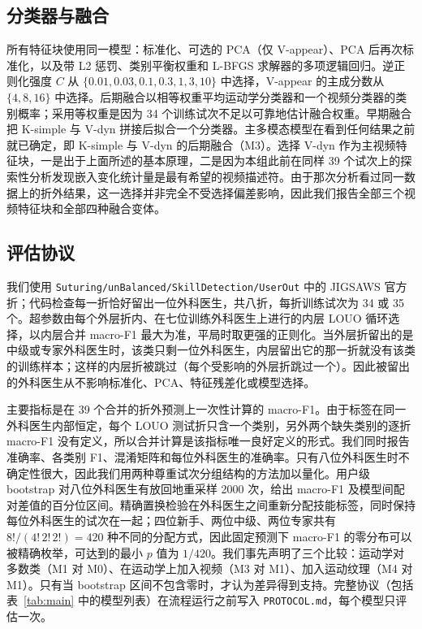 \subsection{分类器与融合}

所有特征块使用同一模型：标准化、可选的 PCA（仅 V-appear）、PCA 后再次标准化，以及带 L2 惩罚、类别平衡权重和 L-BFGS 求解器的多项逻辑回归\citep{pedregosa2011sklearn}。逆正则化强度 $C$ 从 $\{0.01, 0.03, 0.1, 0.3, 1, 3, 10\}$ 中选择，V-appear 的主成分数从 $\{4, 8, 16\}$ 中选择。后期融合以相等权重平均运动学分类器和一个视频分类器的类别概率；采用等权重是因为 34 个训练试次不足以可靠地估计融合权重。早期融合把 K-simple 与 V-dyn 拼接后拟合一个分类器。主多模态模型在看到任何结果之前就已确定，即 K-simple 与 V-dyn 的后期融合（M3）。选择 V-dyn 作为主视频特征块，一是出于上面所述的基本原理，二是因为本组此前在同样 39 个试次上的探索性分析发现嵌入变化统计量是最有希望的视频描述符。由于那次分析看过同一数据上的折外结果，这一选择并非完全不受选择偏差影响，因此我们报告全部三个视频特征块和全部四种融合变体。

\subsection{评估协议}

我们使用 \texttt{Suturing/unBalanced/SkillDetection/UserOut} 中的 JIGSAWS 官方折；代码检查每一折恰好留出一位外科医生，共八折，每折训练试次为 34 或 35 个。超参数由每个外层折内、在七位训练外科医生上进行的内层 LOUO 循环选择，以内层合并 macro-F1 最大为准，平局时取更强的正则化。当外层折留出的是中级或专家外科医生时，该类只剩一位外科医生，内层留出它的那一折就没有该类的训练样本；这样的内层折被跳过（每个受影响的外层折跳过一个）。因此被留出的外科医生从不影响标准化、PCA、特征残差化或模型选择。

主要指标是在 39 个合并的折外预测上一次性计算的 macro-F1。由于标签在同一外科医生内部恒定，每个 LOUO 测试折只含一个类别，另外两个缺失类别的逐折 macro-F1 没有定义，所以合并计算是该指标唯一良好定义的形式。我们同时报告准确率、各类别 F1、混淆矩阵和每位外科医生的准确率。只有八位外科医生时不确定性很大，因此我们用两种尊重试次分组结构的方法加以量化。用户级 bootstrap 对八位外科医生有放回地重采样 2000 次，给出 macro-F1 及模型间配对差值的百分位区间。精确置换检验在外科医生之间重新分配技能标签，同时保持每位外科医生的试次在一起；四位新手、两位中级、两位专家共有 $8!/(4!\,2!\,2!) = 420$ 种不同的分配方式，因此固定预测下 macro-F1 的零分布可以被精确枚举，可达到的最小 $p$ 值为 $1/420$。我们事先声明了三个比较：运动学对多数类（M1 对 M0）、在运动学上加入视频（M3 对 M1）、加入运动纹理（M4 对 M1）。只有当 bootstrap 区间不包含零时，才认为差异得到支持。完整协议（包括表~\ref{tab:main} 中的模型列表）在流程运行之前写入 \texttt{PROTOCOL.md}，每个模型只评估一次。


